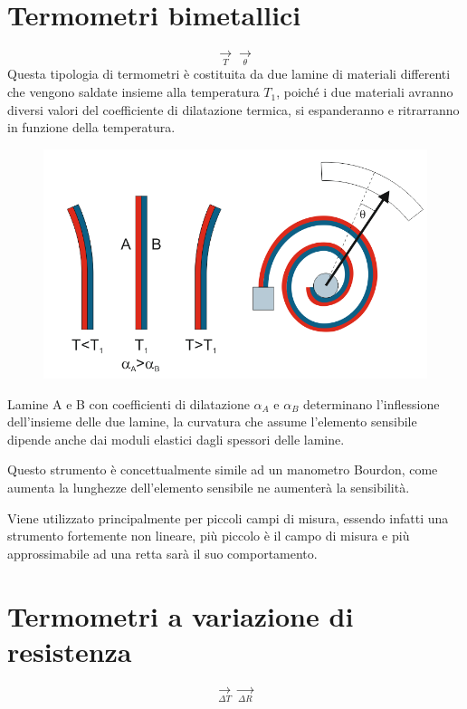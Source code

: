 \documentclass[a4paper, 15pt]{article}
\begin{document}
\section{Termometri bimetallici}
\begin{adjustwidth}{2in}{}
	\[\underset{T}{\rightarrow}\boxed{}\underset{\theta}{\rightarrow}\]
	Questa tipologia di termometri è costituita da due lamine di materiali differenti che vengono saldate insieme alla temperatura $T_1$, poiché i due materiali avranno diversi valori del coefficiente di dilatazione termica, si espanderanno e ritrarranno in funzione della temperatura.
	\begin{figure}[H]
		\centering
		\includegraphics[width=0.5\linewidth]{immagini/screenshot004}
		\label{fig:screenshot004}
	\end{figure}
	Lamine A e B con coefficienti di dilatazione $\alpha_A$ e $\alpha_B$ determinano l'inflessione dell’insieme delle due lamine, la curvatura che assume l'elemento sensibile dipende anche dai moduli elastici dagli spessori delle lamine.\newline 
	
	Questo strumento è concettualmente simile ad un manometro Bourdon, come aumenta la lunghezze dell'elemento sensibile ne aumenterà la sensibilità. \newline 
	
	Viene utilizzato principalmente per piccoli campi di misura, essendo infatti una strumento fortemente non lineare, più piccolo è il campo di misura e più approssimabile ad una retta sarà il suo comportamento.
\end{adjustwidth}
\newpage
\section{Termometri a variazione di resistenza}
\begin{adjustwidth}{2in}{}
		\[\underset{\Delta T}{\rightarrow} \boxed{} \underset{\Delta R}{\rightarrow}\]
\end{adjustwidth}
\end{document}
